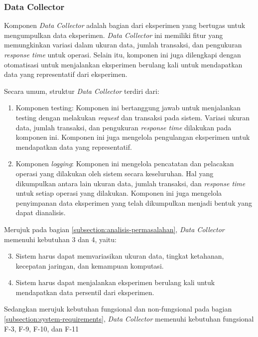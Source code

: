 \subsubsection{Data Collector}
\label{subsubsection:data-collector}

Komponen \textit{Data Collector} adalah bagian dari eksperimen yang bertugas untuk mengumpulkan data eksperimen. \textit{Data Collector} ini memiliki fitur yang memungkinkan variasi dalam ukuran data, jumlah transaksi, dan pengukuran \textit{response time} untuk operasi. Selain itu, komponen ini juga dilengkapi dengan otomatisasi untuk menjalankan eksperimen berulang kali untuk mendapatkan data yang representatif dari eksperimen.

Secara umum, struktur \textit{Data Collector} terdiri dari:

\begin{enumerate}
    \item Komponen testing: Komponen ini bertanggung jawab untuk menjalankan testing dengan melakukan \textit{request} dan transaksi pada sistem. Variasi ukuran data, jumlah transaksi, dan pengukuran \textit{response time} dilakukan pada komponen ini. Komponen ini juga mengelola pengulangan eksperimen untuk mendapatkan data yang representatif.
    \item Komponen \textit{logging}: Komponen ini mengelola pencatatan dan pelacakan operasi yang dilakukan oleh sistem secara keseluruhan. Hal yang dikumpulkan antara lain ukuran data, jumlah transaksi, dan \textit{response time} untuk setiap operasi yang dilakukan. Komponen ini juga mengelola penyimpanan data eksperimen yang telah dikumpulkan menjadi bentuk yang dapat dianalisis.
\end{enumerate}

Merujuk pada bagian \ref{subsection:analisis-permasalahan}, \textit{Data Collector} memenuhi kebutuhan 3 dan 4, yaitu:

\begin{enumerate}
    \setcounter{enumi}{2}
    \item Sistem harus dapat memvariasikan ukuran data, tingkat ketahanan, kecepatan jaringan, dan kemampuan komputasi.
    \item Sistem harus dapat menjalankan eksperimen berulang kali untuk mendapatkan data persentil dari eksperimen.
\end{enumerate}

Sedangkan merujuk kebutuhan fungsional dan non-fungsional pada bagian \ref{subsection:system-requirements}, \textit{Data Collector} memenuhi kebutuhan fungsional F-3, F-9, F-10, dan F-11
